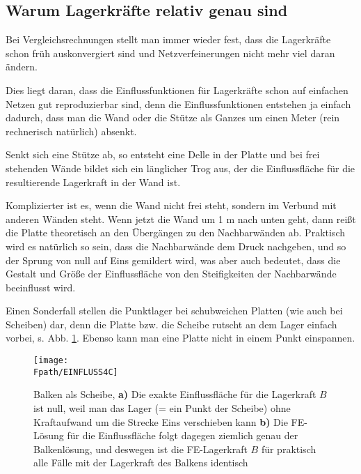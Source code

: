 {\textcolor{sectionTitleBlue}{\section{Warum Lagerkr\"{a}fte relativ genau sind}}} \label{Lagerkraefte}
Bei Vergleichsrechnungen stellt man immer wieder fest, dass die Lagerkr\"{a}fte schon fr\"{u}h auskonvergiert sind und Netzverfeinerungen nicht mehr viel daran \"{a}ndern.


Dies liegt daran, dass die Einflussfunktionen f\"{u}r Lagerkr\"{a}fte schon auf einfachen Netzen gut reproduzierbar sind, denn die Einflussfunktionen entstehen ja einfach dadurch, dass man die Wand oder die St\"{u}tze als Ganzes um einen Meter (rein rechnerisch nat\"{u}rlich) absenkt.

Senkt sich eine St\"{u}tze ab, so entsteht eine Delle in der Platte und bei frei stehenden W\"{a}nde bildet sich ein l\"{a}nglicher Trog aus, der die Einflussfl\"{a}che f\"{u}r die resultierende Lagerkraft in der Wand ist.

Komplizierter ist es, wenn die Wand nicht frei steht, sondern im Verbund mit anderen W\"{a}nden steht. Wenn jetzt die Wand um 1 m nach unten geht, dann rei{\ss}t die Platte theoretisch an den \"{U}berg\"{a}ngen zu den Nachbarw\"{a}nden ab. Praktisch wird es nat\"{u}rlich so sein, dass die Nachbarw\"{a}nde dem Druck nachgeben, und so der Sprung von null auf Eins gemildert wird, was aber auch bedeutet, dass die Gestalt und Gr\"{o}{\ss}e der Einflussfl\"{a}che von den Steifigkeiten der Nachbarw\"{a}nde beeinflusst wird.

Einen Sonderfall stellen die Punktlager bei schubweichen Platten (wie auch bei Scheiben) dar, denn die Platte bzw. die Scheibe rutscht an dem Lager einfach vorbei, s. Abb. \ref{Einfluss4C14}. Ebenso kann man eine Platte nicht in einem Punkt einspannen.
\begin{figure}[tbp]
\centering
\if {} \sidecaption \fi
\texttt{[image: \\Fpath/EINFLUSS4C]}
\caption{Balken als Scheibe, {\bf a)} Die exakte Einflussfl\"{a}che f\"{u}r die Lagerkraft $B$ ist null, weil
man das Lager (= ein Punkt der Scheibe) ohne Kraftaufwand um die Strecke Eins verschieben kann {\bf b)}
Die FE-L\"{o}sung f\"{u}r die Einflussfl\"{a}che folgt dagegen ziemlich genau
der Balkenl\"{o}sung, und deswegen ist die FE-Lagerkraft $B$ f\"{u}r praktisch alle F\"{a}lle mit
der Lagerkraft des Balkens identisch} \label{Einfluss4C14}
\end{figure}%

